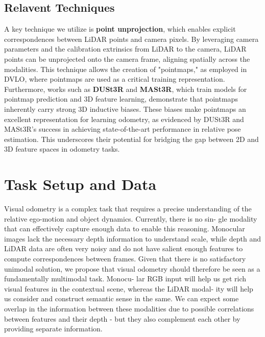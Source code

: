 \documentclass[11pt,a4paper]{article}
\begin{document}

\subsection{Relavent Techniques}
A key technique we utilize is \textbf{point unprojection}, which enables explicit correspondences between LiDAR points and camera pixels. By leveraging camera parameters and the calibration extrinsics from LiDAR to the camera, LiDAR points can be unprojected onto the camera frame, aligning spatially across the modalities. This technique allows the creation of "pointmaps," as employed in DVLO, where pointmaps are used as a critical training representation. Furthermore, works such as \textbf{DUSt3R} \cite{dust3r} and \textbf{MASt3R}\cite{mast3r}, which train models for pointmap prediction and 3D feature learning, demonstrate that pointmaps inherently carry strong 3D inductive biases. These biases make pointmaps an excellent representation for learning odometry, as evidenced by DUSt3R and MASt3R's success in achieving state-of-the-art performance in relative pose estimation. This underscores their potential for bridging the gap between 2D and 3D feature spaces in odometry tasks.

\clearpage
\section{Task Setup and Data}

Visual odometry is a complex task that requires a
precise understanding of the relative ego-motion
and object dynamics. Currently, there is no sin-
gle modality that can effectively capture enough
data to enable this reasoning. Monocular images
lack the necessary depth information to understand
scale, while depth and LiDAR data are often very
noisy and do not have salient enough features to
compute correspondences between frames. Given
that there is no satisfactory unimodal solution, we
propose that visual odometry should therefore be
seen as a fundamentally multimodal task. Monocu-
lar RGB input will help us get rich visual features
in the contextual scene, whereas the LiDAR modal-
ity will help us consider and construct semantic
sense in the same. We can expect some overlap
in the information between these modalities due
to possible correlations between features and their
depth - but they also complement each other by
providing separate information.
\end{document}
